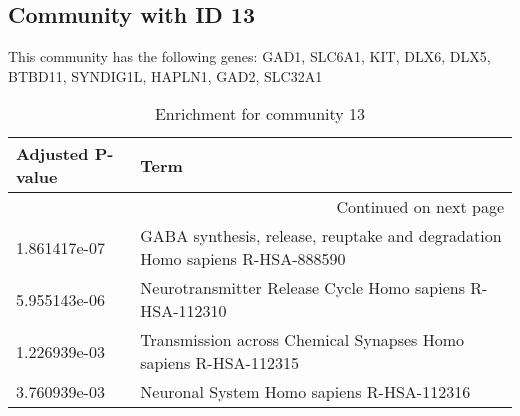 \subsection*{Community with ID 13}
This community has the following genes: GAD1, SLC6A1, KIT, DLX6, DLX5, BTBD11, SYNDIG1L, HAPLN1, GAD2, SLC32A1
\\
\begin{longtable}{p{2.4cm}p{14.5cm}}
\caption{Enrichment for community 13}\\
\toprule
Adjusted \newline P-value &                                                                         Term \\
\midrule
\endhead
\midrule
\multicolumn{2}{r}{{Continued on next page}} \\
\midrule
\endfoot

\bottomrule
\endlastfoot
             1.861417e-07 &  GABA synthesis, release, reuptake and degradation Homo sapiens R-HSA-888590 \\
             5.955143e-06 &                     Neurotransmitter Release Cycle Homo sapiens R-HSA-112310 \\
             1.226939e-03 &              Transmission across Chemical Synapses Homo sapiens R-HSA-112315 \\
             3.760939e-03 &                                    Neuronal System Homo sapiens R-HSA-112316 \\
\end{longtable}


